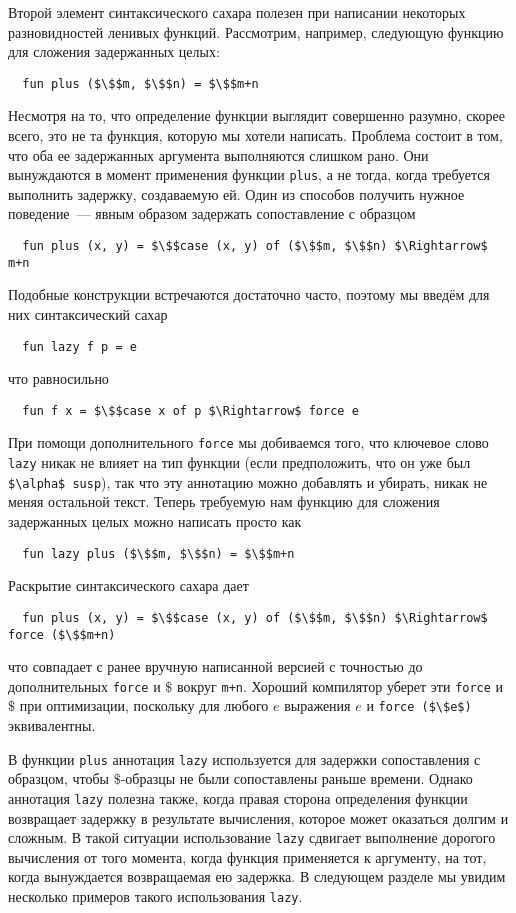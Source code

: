 Второй элемент синтаксического сахара полезен при написании некоторых
разновидностей ленивых функций. Рассмотрим, например, следующую
функцию для сложения задержанных целых:
\begin{lstlisting}
  fun plus ($\$$m, $\$$n) = $\$$m+n
\end{lstlisting}
Несмотря на то, что определение функции выглядит совершенно разумно,
скорее всего, это не та функция, которую мы хотели написать. Проблема
состоит в том, что оба ее задержанных аргумента выполняются слишком
рано.  Они вынуждаются в момент применения функции
\lstinline!plus!, а не тогда, когда требуется выполнить задержку,
создаваемую ей.  Один из способов получить нужное
поведение~--- явным образом задержать сопоставление с образцом
\begin{lstlisting}
  fun plus (x, y) = $\$$case (x, y) of ($\$$m, $\$$n) $\Rightarrow$ m+n
\end{lstlisting}
Подобные конструкции встречаются достаточно часто, поэтому мы введём
для них синтаксический сахар
\begin{lstlisting}
  fun lazy f p = e
\end{lstlisting}
что равносильно
\begin{lstlisting}
  fun f x = $\$$case x of p $\Rightarrow$ force e
\end{lstlisting}
При помощи дополнительного \lstinline!force! мы добиваемся того, что
ключевое слово \lstinline!lazy! никак не влияет на тип функции (если
предположить, что он уже был \lstinline!$\alpha$ susp!), так что эту
аннотацию можно добавлять и убирать, никак не меняя остальной
текст. Теперь требуемую нам функцию для сложения задержанных целых
можно написать просто как
\begin{lstlisting}
  fun lazy plus ($\$$m, $\$$n) = $\$$m+n
\end{lstlisting}
Раскрытие синтаксического сахара дает
\begin{lstlisting}
  fun plus (x, y) = $\$$case (x, y) of ($\$$m, $\$$n) $\Rightarrow$ force ($\$$m+n)
\end{lstlisting}
что совпадает с ранее вручную написанной версией с
точностью до дополнительных \lstinline!force! и $\$$ вокруг
\lstinline!m+n!. Хороший компилятор уберет эти \lstinline!force! и
$\$$ при оптимизации, поскольку для любого $e$ выражения $e$ и
\lstinline!force ($\$e$)! эквивалентны.

В функции \lstinline!plus! аннотация \lstinline!lazy! используется для
задержки сопоставления с образцом, чтобы $\$$-образцы не были
сопоставлены раньше времени. Однако аннотация \lstinline!lazy! полезна
также, когда правая сторона определения функции возвращает задержку
в результате вычисления, которое может оказаться долгим и
сложным.  В такой ситуации использование \lstinline!lazy! сдвигает
выполнение дорогого вычисления от того момента, когда функция
применяется к аргументу, на тот, когда вынуждается возвращаемая ею
задержка. В следующем разделе мы увидим несколько
примеров такого использования \lstinline!lazy!.

